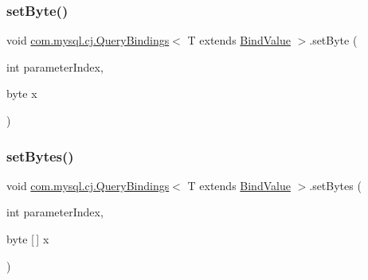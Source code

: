 \subsubsection{\texorpdfstring{set\+Byte()}{setByte()}}
{\footnotesize\ttfamily void \mbox{\hyperlink{interfacecom_1_1mysql_1_1cj_1_1_query_bindings}{com.\+mysql.\+cj.\+Query\+Bindings}}$<$ T extends \mbox{\hyperlink{interfacecom_1_1mysql_1_1cj_1_1_bind_value}{Bind\+Value}} $>$.set\+Byte (\begin{DoxyParamCaption}\item[{int}]{parameter\+Index,  }\item[{byte}]{x }\end{DoxyParamCaption})}

\mbox{\label{interfacecom_1_1mysql_1_1cj_1_1_query_bindings_afe53c908490903fa6c9b340b7b435a3d}} 
\subsubsection{\texorpdfstring{set\+Bytes()}{setBytes()}\hspace{0.1cm}{\footnotesize\ttfamily [1/2]}}
{\footnotesize\ttfamily void \mbox{\hyperlink{interfacecom_1_1mysql_1_1cj_1_1_query_bindings}{com.\+mysql.\+cj.\+Query\+Bindings}}$<$ T extends \mbox{\hyperlink{interfacecom_1_1mysql_1_1cj_1_1_bind_value}{Bind\+Value}} $>$.set\+Bytes (\begin{DoxyParamCaption}\item[{int}]{parameter\+Index,  }\item[{byte \mbox{[}$\,$\mbox{]}}]{x }\end{DoxyParamCaption})}

\mbox{\label{interfacecom_1_1mysql_1_1cj_1_1_query_bindings_a43eed8e96b28e5ff529eb6eb25e01bc7}} 
